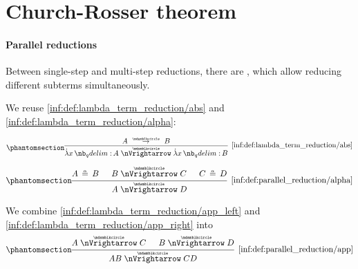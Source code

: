 \section{Church-Rosser theorem}\label{sec:church_rosser_theorem}

\paragraph{Parallel reductions}

\begin{definition}\label{def:parallel_reduction}
  Between single-step and multi-step reductions, there are , which allow reducing different subterms simultaneously.

  \begin{thmenum}
     We reuse \ref{inf:def:lambda_term_reduction/abs} and \ref{inf:def:lambda_term_reduction/alpha}:
    \begin{paracol}{2}
      \begin{leftcolumn}
        \ParacolAlignmentHack
        \begin{equation*}\taglabel[\ensuremath{ \logic{ParAbs}_{\Anon} }]{inf:def:parallel_reduction/abs}
          \begin{prooftree}
            \hypo{ A \pred B }
            \infer1[\ref{inf:def:lambda_term_reduction/abs}]{ \qabs x A \ppred \qabs x B }
          \end{prooftree}
        \end{equation*}
      \end{leftcolumn}

      \begin{rightcolumn}
        \ParacolAlignmentHack
        \begin{equation*}\taglabel[\ensuremath{ \logic{ParAlpha}_{\Anon} }]{inf:def:parallel_reduction/alpha}
          \begin{prooftree}
            \hypo{ A \aequiv B }
            \hypo{ B \ppred C }
            \hypo{ C \aequiv D }
            \infer3[\ref{inf:def:parallel_reduction/alpha}]{ A \ppred D }.
          \end{prooftree}
        \end{equation*}
      \end{rightcolumn}
    \end{paracol}

    We combine \ref{inf:def:lambda_term_reduction/app_left} and \ref{inf:def:lambda_term_reduction/app_right} into
    \begin{equation*}\taglabel[\ensuremath{ \logic{ParApp}_{\Anon} }]{inf:def:parallel_reduction/app}
      \begin{prooftree}
        \hypo{ A \ppred C }
        \hypo{ B \ppred D }
        \infer2[\ref{inf:def:parallel_reduction/app}]{ AB \ppred CD }
      \end{prooftree}
    \end{equation*}


\end{thmenum}
\end{definition}
